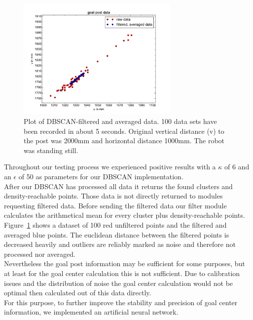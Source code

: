 \documentclass[lnicst,a4paper]{svmultln}
\begin{document}
\begin{figure}
 	\centerline{\includegraphics[width=0.7\textwidth]{dbscan_data_plot1.pdf}}
	{\caption{Plot of DBSCAN-filtered and averaged data. 100 data sets have been recorded in about 5 seconds. Original vertical distance (v) to the post was 2000mm and horizontal distance 1000mm. The robot was standing still.}\label{fig:dbscan_plot1}}
\end{figure}

Throughout our testing process we experienced positive results with a $\kappa$ of 6 and an $\epsilon$ of 50 as parameters for our DBSCAN implementation.
\\
After our DBSCAN has processed all data it returns the found clusters and density-reachable points. Those data is not directly returned to modules requesting filtered data.
Before sending the filtered data our filter module calculates the arithmetical mean for every cluster plus density-reachable points.
\\
Figure~\ref{fig:dbscan_plot1} shows a dataset of 100 red unfiltered points and the filtered and averaged blue points. The euclidean distance between the filtered points is decreased heavily and outliers are reliably marked as noise and therefore not processed nor averaged.
\\
Nevertheless the goal post information may be sufficient for some purposes, but at least for the goal center calculation this is not sufficient. Due to calibration issues and the distribution of noise the goal center calculation would not be optimal then calculated out of this data directly.
\\
For this purpose, to further improve the stability and precision of goal center information, we implemented an artificial neural network.
\end{document}
